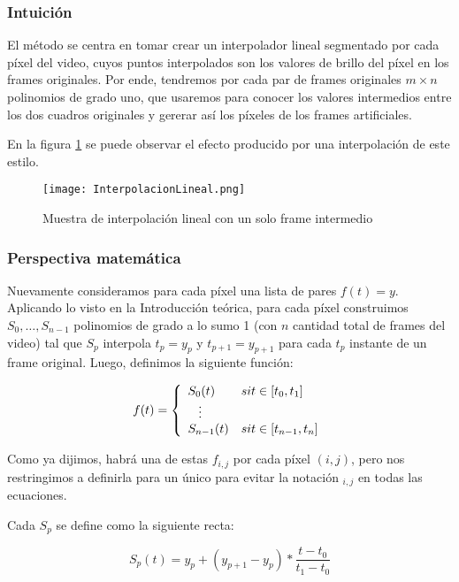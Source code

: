 \subsubsection*{\bf{Intuición}}
El m\'etodo se centra en tomar crear un interpolador lineal segmentado por cada píxel del video, cuyos puntos interpolados son los valores de brillo del píxel en los frames originales. Por ende, tendremos por cada par de frames originales $m \times n$ polinomios de grado uno, que usaremos para conocer los valores intermedios entre los dos cuadros originales y gererar así los píxeles de los frames artificiales.

En la figura \ref{fig:lineal} se puede observar el efecto producido por una interpolación de este estilo.

\begin{figure}[h!]
  \centering
    \texttt{[image: InterpolacionLineal.png]}
     \caption{Muestra de interpolaci\'on lineal con un solo frame intermedio}\label{fig:lineal}
\end{figure}
\noindent

\subsubsection*{\bf{Perspectiva matem\'atica}}
Nuevamente consideramos para cada píxel una lista de pares $f(t)=y$. Aplicando lo visto en la Introducción teórica, para cada píxel construimos $S_0, \ldots, S_{n - 1}$ polinomios de grado a lo sumo 1 (con $n$ cantidad total de frames del video) tal que $S_p$ interpola $t_p=y_p$ y $t_{p + 1}=y_{p+1}$ para cada $t_p$ instante de un frame original. Luego, definimos la siguiente funci\'on:
 
\[
f(t) = 
\left\{
    \begin{array}{ll}
        S_0(t)  & \mbox{si } t \in [t_{0}, t_1] \\
        \hspace{0.3cm}\vdots \\     
        S_{n - 1}(t) & \mbox{si } t \in [t_{n - 1}, t_n]
    \end{array}
\right.
\]

Como ya dijimos, habrá una de estas $f_{i,j}$ por cada píxel $(i,j)$, pero nos restringimos a definirla para un único para evitar la notación $_{i,j}$ en todas las ecuaciones.

Cada $S_p$ se define como la siguiente recta:

$$S_p(t) = y_p + (y_{p+1} - y_p) * \frac{t - t_0}{t_1 - t_0}$$

